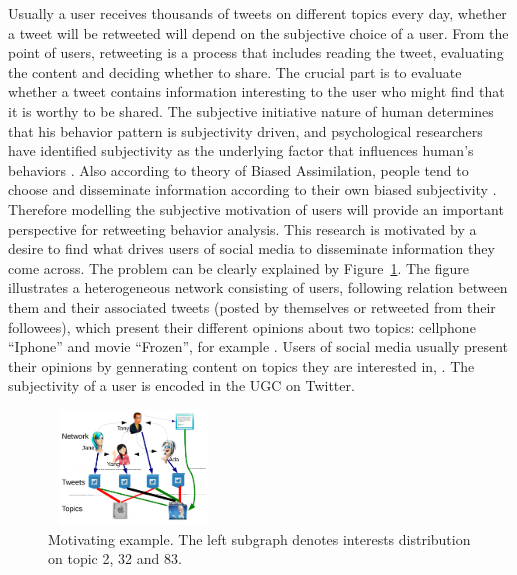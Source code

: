 \documentclass{acm_proc_article-sp}
\begin{document}
Usually a user receives thousands of tweets on different topics every day, whether a tweet will be retweeted will depend on the subjective choice of a user. From the point of users, retweeting is a process that includes reading the tweet, evaluating the content and deciding whether to share. The crucial part is to evaluate whether a tweet contains information interesting to the user who might find that it is worthy to be shared. The subjective initiative nature of human determines that his behavior pattern is subjectivity driven, and psychological researchers have identified subjectivity as the underlying factor that influences human's behaviors \cite{moore2008awareness}. Also according to theory of Biased Assimilation, people tend to choose and disseminate information according to their own biased subjectivity \cite{Hyman2000}. Therefore modelling the subjective motivation of users will provide an important perspective for retweeting behavior analysis. This research is motivated by a desire to find what drives users of social media to disseminate information they come across. The problem can be clearly explained by Figure~\ref{fig00}. The figure illustrates a heterogeneous network consisting of users, following relation between them and their associated tweets (posted by themselves or retweeted from their followees), which present their different opinions about two topics: cellphone ``Iphone'' and movie ``Frozen'', for example . Users of social media usually present their opinions by gennerating content on topics they are interested in, . The subjectivity of a user is encoded in the UGC on Twitter. 
\begin{figure}[htb]
\centering
\includegraphics[width=1.8in,height=1.2in]{Mexample.pdf}
\caption{Motivating example. The left subgraph denotes interests distribution on topic 2, 32 and 83.}
\label{fig00}
\end{figure}
\end{document}
